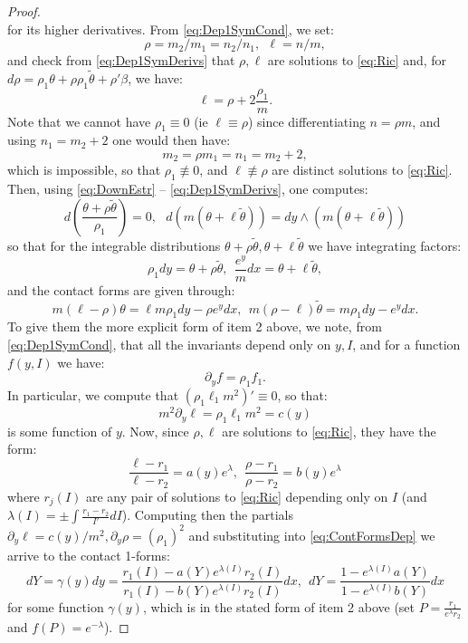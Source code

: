 \documentclass[10pt]{amsart}
\newcommand{\del}{\partial}
\theoremstyle{definition}
\begin{document}
\begin{proof}
\begin{equation}
\end{equation} 
for its higher derivatives.
From \eqref{eq:Dep1SymCond}, we set:
\[ \rho = m_2/m_1 = n_2/n_1, ~~\ell = n/m,  \]
and check from \eqref{eq:Dep1SymDerivs} that $\rho, \ell$ are solutions to \eqref{eq:Ric} and, for $d\rho = \rho_1\theta + \rho \rho_1\tilde\theta + \rho'\beta$, we have:
\[ \ell = \rho + 2\frac{\rho_1}{m}. \]
Note that we cannot have $\rho_1\equiv 0$ (ie $\ell\equiv\rho$) since differentiating $n = \rho m$, and using $n_1 = m_2 + 2$ one would then have:
\[ m_2 = \rho m_1 = n_1 = m_2 + 2, \]
which is impossible, so that $\rho_1\not\equiv 0$, and $\ell\not\equiv\rho$ are distinct solutions to \eqref{eq:Ric}. Then, using \eqref{eq:DownEstr} -- \eqref{eq:Dep1SymDerivs}, one computes:
\[ d\left( \frac{\theta + \rho\tilde\theta}{\rho_1} \right) = 0 , ~~~ d\left( m (\theta + \ell\tilde\theta) \right) = dy \wedge \left( m(\theta + \ell\tilde\theta) \right)  \]
so that for the integrable distributions $\theta + \rho\tilde\theta, \theta + \ell \tilde\theta$ we have integrating factors:
\[ \rho_1dy = \theta + \rho\tilde\theta, ~~ \frac{e^y}{m} dx = \theta + \ell\tilde\theta, \]
and the contact forms are given through:
\begin{equation}\label{eq:ContFormsDep}
    m(\ell - \rho) \theta = \ell m\rho_1 dy - \rho e^{y} dx, ~~m(\rho - \ell)\tilde\theta = m\rho_1dy - e^y dx.
\end{equation}
To give them the more explicit form of item 2 above, we note, from \eqref{eq:Dep1SymCond}, that all the invariants depend only on $y, I$, and for a function $f(y,I)$ we have:
\[ \del_yf = \rho_1f_1. \]
In particular, we compute that $(\rho_1\ell_1 m^2)' \equiv 0$, so that:
\[ m^2 \del_y\ell  = \rho_1\ell_1 m^2 = c(y) \]
is some function of $y$. Now, since $\rho, \ell$ are solutions to \eqref{eq:Ric}, they have the form:
\[ \frac{\ell - r_1}{\ell - r_2} = a(y) e^\lambda, ~~\frac{\rho - r_1}{\rho - r_2} = b(y) e^\lambda \]
where $r_j(I)$ are any pair of solutions to \eqref{eq:Ric} depending only on $I$ (and $\lambda(I) = \pm \int \frac{r_1 - r_2}{I'} dI$). Computing then the partials $\del_y\ell = c(y)/m^2, \del_y\rho = (\rho_1)^2$ and substituting into \eqref{eq:ContFormsDep} we arrive to the contact 1-forms:
\[ dY = \gamma(y) dy = \frac{r_1(I) - a(Y) e^{\lambda(I)}r_2(I) }{r_1(I) - b(Y) e^{\lambda(I)}r_2(I)} dx, ~~dY = \frac{1 - e^{\lambda(I)}a(Y)}{1 - e^{\lambda(I)}b(Y)}dx \]
for some function $\gamma(y)$,
which is in the stated form of item 2 above (set $P = \frac{r_1}{e^\lambda r_2}$ and $f(P) = e^{-\lambda}$).
\end{proof}
\end{document}
